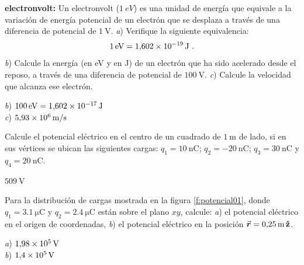 %
\begin{Exercise}
  \textbf{electronvolt:} Un electronvolt ($\SI{1}{eV}$) es una unidad de energía que equivale a la variación de energía potencial de un electrón que se desplaza a través de una diferencia de potencial de $\SI{1}{\volt}$. \textit{a}) Verifique la siguiente equivalencia: \[\SI{1}{eV} = \SI{1.602E-19}{\joule}~.\] \textit{b}) Calcule la energía (en eV y en J) de un electrón que ha sido acelerado desde el reposo, a través de una diferencia de potencial de $\SI{100}{\volt}$. \textit{c}) Calcule la velocidad que alcanza ese electrón.
\end{Exercise}
\begin{Answer}
	\begin{minipage}[t]{.4\textwidth}
    \textit{b}) $\SI{100}{eV} = \SI{1.602E-17}{\joule}$\\ \textit{c}) $\SI{5.93E6}{\metre/\second}$
  \end{minipage}
\end{Answer}
%
\begin{Exercise}
  Calcule el potencial eléctrico en el centro de un cuadrado de $\SI{1}{\metre}$ de lado, si en sus vértices se ubican las siguientes cargas: $q_1 = \SI{10}{\nano\coulomb}$; $q_2 = \SI{-20}{\nano\coulomb}$; $q_3 = \SI{30}{\nano\coulomb}$ y $q_4 = \SI{20}{\nano\coulomb}$.
\end{Exercise}
\begin{Answer}
  $\SI{509}{\volt}$
\end{Answer}
%
\begin{Exercise}\label{p:potencial01}
  Para la distribución de cargas mostrada en la figura \ref{f:potencial01}, donde $q_1 = \SI{3.1}{\micro\coulomb}$ y $q_2 = \SI{2.4}{\micro\coulomb}$ están sobre el plano $xy$, calcule: \textit{a}) el potencial eléctrico en el origen de coordenadas, \textit{b}) el potencial eléctrico en la posición $\va*{r} =\SI{0.25}{\metre}\,\vu{z}$.
\end{Exercise}
\begin{Answer}
	\begin{minipage}[t]{.4\textwidth}
    \textit{a}) $\SI{1.98E5}{\volt}$\\ \textit{b}) $\SI{1.4E5}{\volt}$
  \end{minipage}
\end{Answer}
%
\begin{center}
\end{center}
